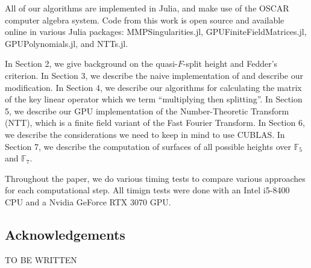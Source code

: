 All of our algorithms are implemented in Julia, and
make use of the OSCAR computer algebra system.
Code from this work is open source and available online 
in various
Julia packages: MMPSingularities.jl,
GPUFiniteFieldMatrices.jl, GPUPolynomials.jl,
and NTTs.jl.

In Section 2, we give background on the quasi-\(F\)-split height
and Fedder's criterion.
In Section 3, we describe the naive implementation of
\cite[Theorem~C]{kty-2022-fedder} and describe
our modification.
In Section 4, we describe our algorithms for calculating the matrix
of the key linear operator which we term ``multiplying then splitting''.
In Section 5, we describe our GPU implementation of the Number-Theoretic
Transform (NTT), which is a finite field variant of the Fast
Fourier Transform.
In Section 6, we describe the considerations we need to keep in mind
to use CUBLAS.
In Section 7, we describe the computation of surfaces of all possible
heights over \(\mathbb{F}_{5}\) and \(\mathbb{F}_{7}\).


Throughout the paper, we do various timing tests to compare various
approaches for each computational step.
All timign tests were done with 
an Intel i5-8400 CPU and a Nvidia GeForce RTX 3070 GPU.

\subsection{Acknowledgements}

TO BE WRITTEN

